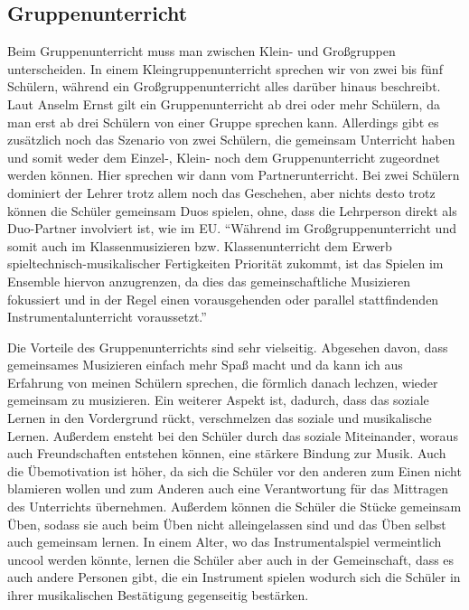 \subsection{Gruppenunterricht} 
Beim Gruppenunterricht muss man zwischen Klein- und Großgruppen unterscheiden.
In einem Kleingruppenunterricht sprechen wir von zwei bis fünf Schülern, während
ein Großgruppenunterricht alles darüber hinaus beschreibt.
\autocite[219]{busch:grundwissen_instrumentalpaedagogik} Laut Anselm Ernst gilt
ein Gruppenunterricht ab drei oder mehr Schülern, da man erst ab drei Schülern
von einer Gruppe sprechen kann.
\autocite[79]{ernst:die_zukunftsfaehige_musikschule}
Allerdings gibt es zusätzlich noch das Szenario von zwei Schülern, die gemeinsam
Unterricht haben und somit weder dem Einzel-, Klein- noch dem Gruppenunterricht
zugeordnet werden können. Hier sprechen wir dann vom
Partnerunterricht.\autocite[219]{busch:grundwissen_instrumentalpaedagogik} Bei
zwei Schülern dominiert der Lehrer trotz allem noch das Geschehen, aber nichts
desto trotz können die Schüler gemeinsam Duos spielen, ohne, dass die Lehrperson
direkt als Duo-Partner involviert ist, wie im EU. \enquote{Während im
Großgruppenunterricht und somit auch im Klassenmusizieren bzw. Klassenunterricht
dem Erwerb spieltechnisch-musikalischer Fertigkeiten Priorität zukommt, ist das
Spielen im Ensemble hiervon anzugrenzen, da dies das gemeinschaftliche
Musizieren fokussiert und in der Regel einen vorausgehenden oder parallel
stattfindenden Instrumentalunterricht
voraussetzt.}\autocite[219]{busch:grundwissen_instrumentalpaedagogik}

Die Vorteile des Gruppenunterrichts sind sehr vielseitig. Abgesehen davon, dass
gemeinsames Musizieren einfach mehr Spaß macht und da kann ich aus Erfahrung von
meinen Schülern sprechen, die förmlich danach lechzen, wieder gemeinsam zu
musizieren. Ein weiterer Aspekt ist, dadurch, dass das soziale Lernen in den
Vordergrund rückt, verschmelzen das soziale und musikalische Lernen. Außerdem
ensteht bei den Schüler durch das soziale Miteinander, woraus auch
Freundschaften entstehen können, eine stärkere Bindung zur Musik. Auch die
Übemotivation ist höher, da sich die Schüler vor den anderen zum Einen nicht
blamieren wollen und zum Anderen auch eine Verantwortung für das Mittragen des
Unterrichts übernehmen. Außerdem können die Schüler die Stücke gemeinsam Üben,
sodass sie auch beim Üben nicht alleingelassen sind und das Üben selbst auch
gemeinsam lernen. In einem Alter, wo das Instrumentalspiel vermeintlich uncool
werden könnte, lernen die Schüler aber auch in der Gemeinschaft, dass es auch
andere Personen gibt, die ein Instrument spielen wodurch sich die Schüler in
ihrer musikalischen Bestätigung gegenseitig bestärken.
\autocite{ernst:die_zukunftsfaehige_musikschule}


